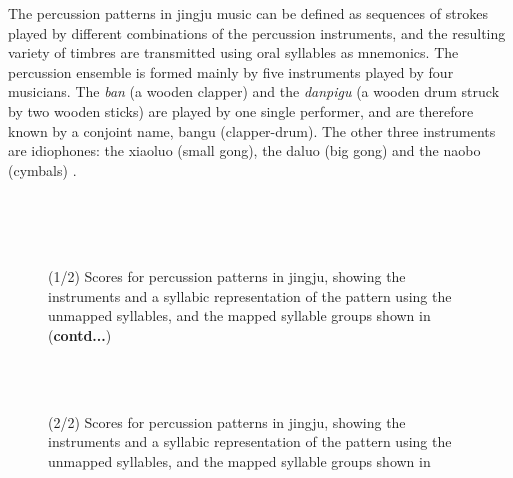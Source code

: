 The percussion patterns in \gls{jingju} music can be defined as sequences of strokes played by different combinations of the percussion instruments, and the resulting variety of timbres are transmitted using oral syllables as mnemonics. The percussion ensemble is formed mainly by five instruments played by four musicians. The \textit{ban} (a wooden clapper) and the \textit{danpigu} (a wooden drum struck by two wooden sticks) are played by one single performer, and are therefore known by a conjoint name, \gls{bangu} (clapper-drum). The other three instruments are idiophones: the \gls{xiaoluo} (small gong), the \gls{daluo} (big gong) and the \gls{naobo} (cymbals) \cite{lee:99:chineseInst,wichmann:91:BOaural}. 
\begin{figure}
\centering
{} \\
 \\
 \\
\caption[Percussion patterns in Beijing opera (\gls{jingju})]{(1/2) Scores for percussion patterns in \gls{jingju}, showing the instruments and a syllabic representation of the pattern using the unmapped syllables, and the mapped syllable groups shown in  (\textbf{contd...})}\label{fig:bopatt:scores}
\end{figure}
%
\begin{figure}
\addtocounter{subfigure}{3} %
\addtocounter{figure}{-1}  %
\centering
{} \\
 \\
\caption[]{(2/2) Scores for percussion patterns in \gls{jingju}, showing the instruments and a syllabic representation of the pattern using the unmapped syllables, and the mapped syllable groups shown in }%
\end{figure}

